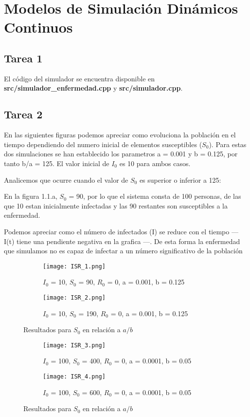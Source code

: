\chapter{Modelos de Simulación Dinámicos Continuos}

\section{Tarea 1}

El código del simulador se encuentra disponible en \textbf{src/simulador\_enfermedad.cpp} y \textbf{src/simulador.cpp}.

\section{Tarea 2}

En las siguientes figuras podemos apreciar como evoluciona la población en el tiempo dependiendo del numero inicial de elementos susceptibles ($S_0$).
Para estas dos simulaciones se han establecido los parametros a = 0.001 y b = 0.125, por tanto b/a = 125. El valor inicial de $I_0$ es 10 para ambos casos.

Analicemos que ocurre cuando el valor de $S_0$ es superior o inferior a 125:

En la figura 1.1.a, $S_0$ = 90, por lo que el sistema consta de 100 personas, de las que 10 estan inicialmente infectadas y las 90 restantes son susceptibles a la enfermedad.

Podemos apreciar como el número de infectados (I) se reduce con el tiempo --- I(t) tiene una pendiente negativa en la grafica ---. De esta forma la enfermedad que simulamos no es capaz de infectar a un número significativo de la población

\begin{figure}[H]
	\centering
	\begin{subfigure}[b]{0.8\textwidth}
		\centering
		\texttt{[image: ISR\_1.png]}
		\caption{$I_0$ = 10, $S_0$ = 90, $R_0$ = 0, a = 0.001, b = 0.125}
	\end{subfigure}
	\hfill
	\begin{subfigure}[b]{0.8\textwidth}
		\centering
		\texttt{[image: ISR\_2.png]}
		\caption{$I_0$ = 10, $S_0$ = 190, $R_0$ = 0, a = 0.001, b = 0.125}
	\end{subfigure}
	\caption{Resultados para $S_0$ en relación a $a/b$}
\end{figure}


\begin{figure}[H]
	\centering
	\begin{subfigure}[b]{0.8\textwidth}
		\centering
		\texttt{[image: ISR\_3.png]}
		\caption{$I_0$ = 100, $S_0$ = 400, $R_0$ = 0, a = 0.0001, b = 0.05}
	\end{subfigure}
	\hfill
	\begin{subfigure}[b]{0.8\textwidth}
		\centering
		\texttt{[image: ISR\_4.png]}
		\caption{$I_0$ = 100, $S_0$ = 600, $R_0$ = 0, a = 0.0001, b = 0.05}
	\end{subfigure}
	\caption{Resultados para $S_0$ en relación a $a/b$}
\end{figure}

